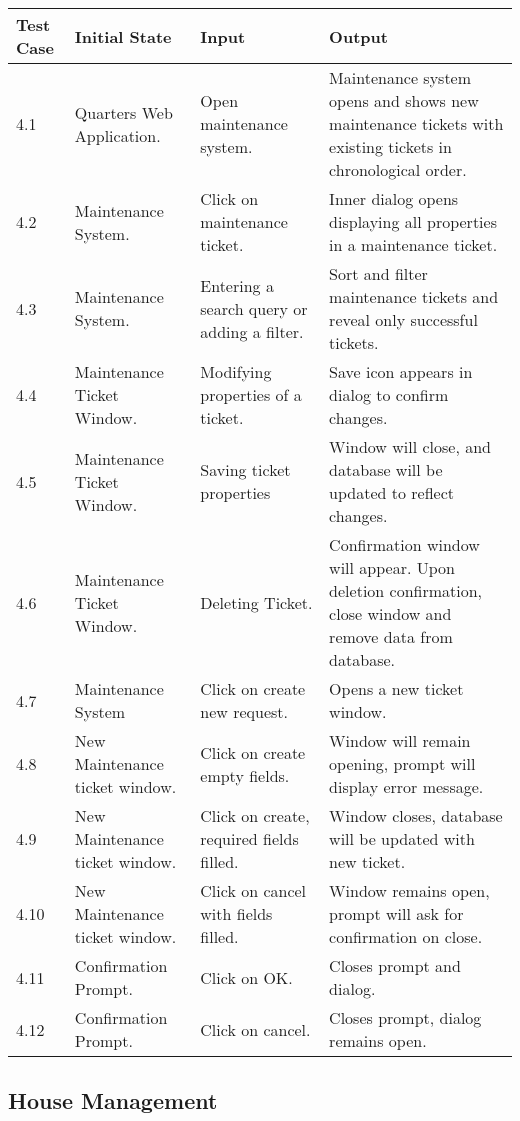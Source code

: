 \documentclass[12pt]{article}
\begin{document}
\begin{longtable}{|p{2cm}|p{3cm}|p{5cm}|p{5cm}|}
\hline
\textbf{Test Case}  & \textbf{Initial State} & \textbf{Input} & \textbf{Output} \\ \hline
4.1 & Quarters Web Application. & Open maintenance system. & Maintenance system opens and shows new maintenance tickets with existing tickets in chronological order. \\ 
\hline
4.2 & Maintenance System. & Click on maintenance ticket. & Inner dialog opens displaying all properties in a maintenance ticket. \\
\hline
4.3 & Maintenance System. & Entering a search query or adding a filter. & Sort and filter maintenance tickets and reveal only successful tickets. \\
\hline
4.4 & Maintenance Ticket Window. & Modifying properties of a ticket. & Save icon appears in dialog to confirm changes.\\
\hline
4.5 & Maintenance Ticket Window. & Saving ticket properties & Window will close, and database will be updated to reflect changes.\\
\hline
4.6 & Maintenance Ticket Window. & Deleting Ticket. & Confirmation window will appear. Upon deletion confirmation, close window and remove data from database.\\
\hline
4.7 & Maintenance System & Click on create new request. & Opens a new ticket window.\\
\hline
4.8 & New Maintenance ticket window. & Click on create empty fields. & Window will remain opening, prompt will display error message.\\
\hline
4.9 & New Maintenance ticket window. & Click on create, required fields filled. & Window closes, database will be updated with new ticket.\\
\hline
4.10 & New Maintenance ticket window. & Click on cancel with fields filled. & Window remains open, prompt will ask for confirmation on close.\\
\hline
4.11 & Confirmation Prompt. & Click on OK. & Closes prompt and dialog. \\
\hline
4.12 & Confirmation Prompt. & Click on cancel. & Closes prompt, dialog remains open.\\
\hline
\end{longtable}

\subsection{House Management}
\end{document}
